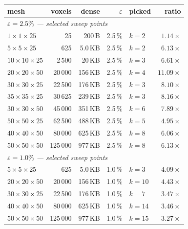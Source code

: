 \begin{table}[t]
  \centering
  \small
  \begin{tabular}{l r r r l r}
    \toprule
    mesh & voxels & dense & $\varepsilon$ & picked & ratio \\
    \midrule
    \multicolumn{6}{l}{\emph{$\varepsilon = 2.5\%$ — selected sweep points}} \\
    $1\!\times\!1\!\times\!25$       & 25       & 200\,B    & 2.5\,\% & $k{=}2$ & $1.14\times$ \\
    $5\!\times\!5\!\times\!25$       & 625      & 5.0\,KB   & 2.5\,\% & $k{=}2$ & $6.13\times$ \\
    $10\!\times\!10\!\times\!25$     & 2\,500   & 20\,KB    & 2.5\,\% & $k{=}3$ & $6.61\times$ \\
    $20\!\times\!20\!\times\!50$     & 20\,000  & 156\,KB   & 2.5\,\% & $k{=}4$ & $\mathbf{11.09\times}$ \\
    $30\!\times\!30\!\times\!25$     & 22\,500  & 176\,KB   & 2.5\,\% & $k{=}3$ & $8.10\times$ \\
    $35\!\times\!35\!\times\!25$     & 30\,625  & 239\,KB   & 2.5\,\% & $k{=}3$ & $8.16\times$ \\
    $30\!\times\!30\!\times\!50$     & 45\,000  & 351\,KB   & 2.5\,\% & $k{=}6$ & $7.89\times$ \\
    $50\!\times\!50\!\times\!25$     & 62\,500  & 488\,KB   & 2.5\,\% & $k{=}5$ & $4.95\times$ \\
    $40\!\times\!40\!\times\!50$     & 80\,000  & 625\,KB   & 2.5\,\% & $k{=}8$ & $6.06\times$ \\
    $50\!\times\!50\!\times\!50$     & 125\,000 & 977\,KB   & 2.5\,\% & $k{=}8$ & $6.13\times$ \\
    \midrule
    \multicolumn{6}{l}{\emph{$\varepsilon = 1.0\%$ — selected sweep points}} \\
    $5\!\times\!5\!\times\!25$       & 625      & 5.0\,KB   & 1.0\,\% & $k{=}3$ & $4.09\times$ \\
    $20\!\times\!20\!\times\!50$     & 20\,000  & 156\,KB   & 1.0\,\% & $k{=}10$ & $4.43\times$ \\
    $30\!\times\!30\!\times\!25$     & 22\,500  & 176\,KB   & 1.0\,\% & $k{=}7$ & $3.47\times$ \\
    $40\!\times\!40\!\times\!50$     & 80\,000  & 625\,KB   & 1.0\,\% & $k{=}14$ & $3.46\times$ \\
    $50\!\times\!50\!\times\!50$     & 125\,000 & 977\,KB   & 1.0\,\% & $k{=}15$ & $3.27\times$ \\

\end{tabular}
\end{table}
